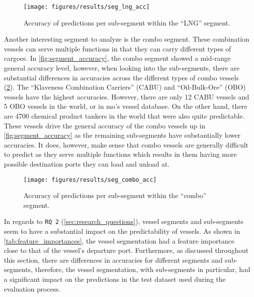 \begin{figure}[htbp]
    \centering
    \texttt{[image: figures/results/seg\_lng\_acc]}
    \caption{Accuracy of predictions per sub-segment within the ``LNG'' segment.}
    \label{fig:lng_accuracy}
\end{figure}

Another interesting segment to analyze is the combo segment. These combination vessels can serve multiple functions in that they can carry different types of cargoes. In \cref{fig:segment_accuracy}, the combo segment showed a mid-range general accuracy level, however, when looking into the sub-segments, there are substantial differences in accuracies across the different types of combo vessels (\cref{fig:combo_accuracy}). The ``Klaveness Combination Carriers'' (CABU) and ``Oil-Bulk-Ore'' (OBO) vessels have the highest accuracies. However, there are only 12 CABU vessels and 5 OBO vessels in the world, or in \acrfull{mo}'s vessel database. On the other hand, there are 4700 chemical product tankers in the world that were also quite predictable. These vessels drive the general accuracy of the combo vessels up in \cref{fig:segment_accuracy} as the remaining sub-segments have substantially lower accuracies. It does, however, make sense that combo vessels are generally difficult to predict as they serve multiple functions which results in them having more possible destination ports they can load and unload at.

\begin{figure}[htbp]
    \centering
    \texttt{[image: figures/results/seg\_combo\_acc]}
    \caption{Accuracy of predictions per sub-segment within the ``combo'' segment.}
    \label{fig:combo_accuracy}
\end{figure}

In regards to \texttt{RQ 2} (\cref{sec:research_questions}), vessel segments and sub-segments seem to have a substantial impact on the predictability of vessels. As shown in \cref{tab:feature_importances}, the vessel segmentation had a feature importance close to that of the vessel's departure port. Furthermore, as discussed throughout this section, there are differences in accuracies for different segments and sub-segments, therefore, the vessel segmentation, with sub-segments in particular, had a significant impact on the predictions in the test dataset used during the evaluation process.

